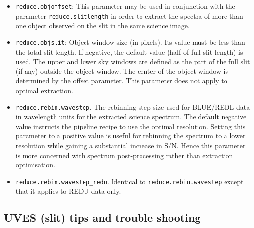 \begin{itemize}
    the spatial profile in the spectrum extraction. 
    The default negative value instructs the pipeline recipe to
    read the slit length from the science object FITS header. Setting this parameter to smaller values
    than the slit length in the header may sometimes be useful in avoiding problems at the order edges,
    with the disadvantage that the maximum achievable S/N will be smaller (less pixels involved in the
    extraction).
    \item {\tt reduce.objoffset}: This parameter may be used in conjunction with the parameter\newline
    {\tt reduce.slitlength} in order to extract the spectra of more than one object observed on the
    slit in the same science image. 
    \item {\tt reduce.objslit}: Object window size (in pixels). 
    Its value must be less than the total slit length.
    If negative, the default value (half of full slit length) is used. The upper and lower sky windows are
    defined as the part of the full slit (if any) outside the object window. 
    The center of the object window
    is determined by the offset parameter. This parameter does not apply to optimal extraction.
    \item {\tt reduce.rebin.wavestep}. The rebinning step size used for BLUE/REDL data in wavelength
    units for the extracted science spectrum. The default negative value instructs the pipeline recipe
    to use the optimal resolution. Setting this parameter to a positive value is useful for rebinning the
    spectrum to a lower resolution while gaining a substantial increase in S/N. Hence this parameter is
    more concerned with spectrum post-processing rather than extraction optimisation.
    \item {\tt reduce.rebin.wavestep\_redu}. Identical to {\tt reduce.rebin.wavestep} except
    that it applies to REDU data only.
\end{itemize}

\subsection{UVES (slit) tips and trouble shooting}


